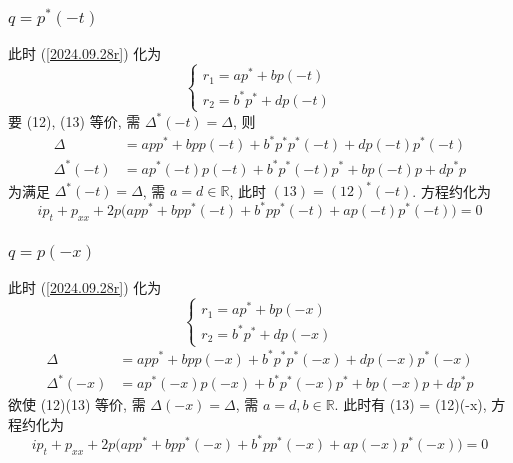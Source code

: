 \subsubsection{$ q=p^{*}(-t) $}
此时 (\ref{2024.09.28r}) 化为
\begin{equation*}
    \begin{cases}
        r_1 = ap^{*} + bp(-t) \\
        r_2 = b^{*}p^{*} + dp(-t)
    \end{cases}
\end{equation*}
要 (12), (13) 等价, 需 $ \Delta^{*}(-t) = \Delta $, 则
\begin{equation*}
    \begin{aligned}
        \Delta &= app^{*} + bpp(-t) + b^{*}p^{*}p^{*}(-t) + dp(-t)p^{*}(-t) \\
        \Delta^{*}(-t) &= ap^{*}(-t)p(-t) + b^{*}p^{*}(-t)p^{*} + bp(-t)p + dp^{*}p 
    \end{aligned}
\end{equation*}
为满足 $ \Delta^{*}(-t) = \Delta $, 需 $ a = d \in \mathbb{R} $, 此时 $ (13) = (12)^{*}(-t) $. 方程约化为
\begin{equation*}
    ip_{t} + p_{xx} + 2p\big(app^{*} + bpp^{*}(-t) + b^{*}pp^{*}(-t) + ap(-t)p^{*}(-t)\big) = 0
\end{equation*}

\subsubsection{$ q = p(-x)$}
此时 (\ref{2024.09.28r}) 化为
\begin{equation*}
    \begin{cases}
        r_1 = ap^{*} + bp(-x) \\
        r_2 = b^{*}p^{*} + dp(-x)
    \end{cases}
\end{equation*}
\begin{equation*}
    \begin{aligned}
        \Delta &= app^{*} + bpp(-x) + b^{*}p^{*}p^{*}(-x) + dp(-x)p^{*}(-x) \\
        \Delta^{*}(-x) &= ap^{*}(-x)p(-x) + b^{*}p^{*}(-x)p^{*} + bp(-x)p + dp^{*}p 
    \end{aligned}
\end{equation*}
欲使 (12)(13) 等价, 需 $ \Delta(-x) = \Delta $, 需 $ a = d, b \in \mathbb{R} $. 此时有 (13) = (12)(-x), 方程约化为
\begin{equation*}
    ip_{t} + p_{xx} + 2p\big(app^{*} + bpp^{*}(-x) + b^{*}pp^{*}(-x) + ap(-x)p^{*}(-x)\big) = 0
\end{equation*}

